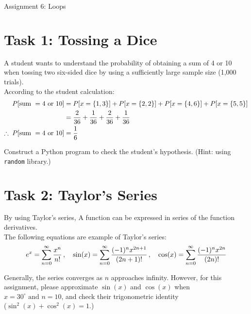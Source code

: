 \documentclass[11pt]{article}
\begin{document}
\begin{center}
    \Large{Assignment 6: Loops}
\end{center}

\section*{Task 1: Tossing a Dice}
A student wants to understand the probability of obtaining a sum of 4 or 10 when tossing two six-sided dice by using a sufficiently large sample size (1,000 trials).\\

\noindent
According to the student calculation:
\[
\begin{aligned}
    P[\text{sum } = 4 \text{ or } 10] &= P[x = \{1, 3\}] + P[x = \{2, 2\}] + P[x = \{4, 6\}] + P[x = \{5, 5\}]\\
    &= \frac{2}{36} + \frac{1}{36} + \frac{2}{36} + \frac{1}{36}\\
    \therefore \hspace{0.1cm} P[\text{sum } = 4 \text{ or } 10] &= \frac{1}{6}
\end{aligned}
\]

\noindent
Construct a Python program to check the student's hypothesis. (Hint: using \texttt{random} library.)

\begin{tcolorbox}[colback=black!10!white, colframe=black!75!white, title=\textbf{Answer}]
    \vspace{3cm}
\end{tcolorbox}    


\section*{Task 2: Taylor's Series}

By using Taylor's series, A function can be expressed in series of the function derivatives.\\
\noindent
The following equations are example of Taylor's series:
\[
e^x = \sum_{n=0}^\infty \frac{x^n}{n!} \, , \quad \sin(x) = \sum_{n=0}^\infty \frac{(-1)^n x^{2n + 1}}{(2n + 1)!} \, , \quad \cos(x) = \sum_{n=0}^\infty \frac{(-1)^n x^{2n}}{(2n)!}\\
\]

\noindent
Generally, the series converges as \(n\) approaches infinity. However, for this assignment, please approximate \(\sin(x)\) and \(\cos(x)\) when \(x=30^{\circ} \text{ and } n=10\), and check their trigonometric identity\\(\(\sin^2(x) + \cos^2(x) = 1\).)

\begin{tcolorbox}[colback=black!10!white, colframe=black!75!white, title=\textbf{Answer}]
    \vspace{3cm}
\end{tcolorbox} 
\end{document}
